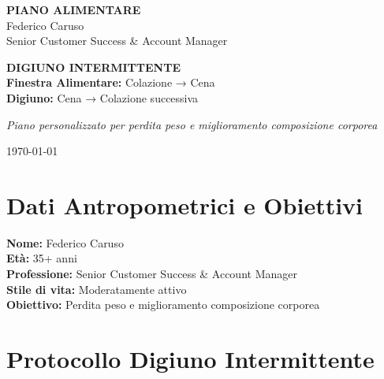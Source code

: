 \documentclass[11pt,a4paper]{article}
\begin{document}
\begin{titlepage}
\centering
\vspace*{2cm}

{\Huge\textbf{\textcolor{maincolor}{PIANO ALIMENTARE}}}\\
\vspace{1cm}
{\LARGE\textcolor{accentcolor}{Federico Caruso}}\\
\vspace{0.5cm}
{\large Senior Customer Success \& Account Manager}

\vspace{3cm}

\begin{tcolorbox}[colback=lightgray,colframe=maincolor,boxrule=2pt,arc=5pt]
\centering
\textbf{\large DIGIUNO INTERMITTENTE}\\
\vspace{0.5cm}
\textbf{Finestra Alimentare:} Colazione → Cena\\
\textbf{Digiuno:} Cena → Colazione successiva
\end{tcolorbox}

\vspace{2cm}
\textit{\large Piano personalizzato per perdita peso e miglioramento composizione corporea}

\vfill
\textcolor{maincolor}{\today}
\end{titlepage}

\tableofcontents
\newpage

\section{Dati Antropometrici e Obiettivi}

\begin{tcolorbox}[colback=lightgray,colframe=maincolor,boxrule=1pt,arc=3pt]
\textbf{Nome:} Federico Caruso\\
\textbf{Età:} 35+ anni\\
\textbf{Professione:} Senior Customer Success \& Account Manager\\
\textbf{Stile di vita:} Moderatamente attivo\\
\textbf{Obiettivo:} Perdita peso e miglioramento composizione corporea
\end{tcolorbox}

\section{Protocollo Digiuno Intermittente}
\end{document}
